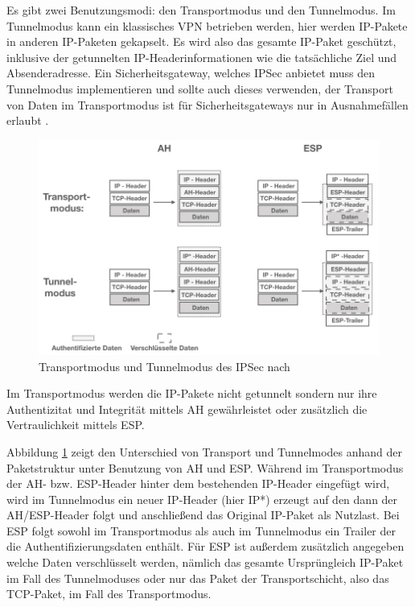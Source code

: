 Es gibt zwei Benutzungsmodi: den Transportmodus und den Tunnelmodus. Im  Tunnelmodus kann ein klassisches VPN betrieben werden, hier werden IP-Pakete in anderen IP-Paketen gekapselt. Es wird also das gesamte IP-Paket geschützt, inklusive der getunnelten IP-Headerinformationen wie die tatsächliche Ziel und Absenderadresse. Ein Sicherheitsgateway, welches IPSec anbietet muss den Tunnelmodus implementieren und sollte auch dieses verwenden, der Transport von Daten im Transportmodus ist für Sicherheitsgateways nur in Ausnahmefällen erlaubt \cite{rfc4301}. 
\begin{figure}[h]
	\includegraphics[width=\linewidth]{ahsep.001.jpeg}
	\caption{Transportmodus und Tunnelmodus des IPSec nach \cite{lipp2007vpn}}
	\label{ahesp}
\end{figure}
Im Transportmodus werden die IP-Pakete nicht getunnelt sondern nur ihre Authentizitat und Integrität mittels AH ge\-währleistet oder zusätzlich die Vertraulichkeit mittels ESP. 

Abbildung \ref{ahesp} zeigt den Unterschied von Transport und Tunnelmodes anhand der Paketstruktur unter Benutzung von AH und ESP. Während im Transportmodus der AH- bzw. ESP-Header  hinter dem bestehenden IP-Header eingefügt wird, wird im Tunnelmodus ein neuer IP-Header (hier IP*) erzeugt auf den dann der AH/ESP-Header folgt und anschließend das Original IP-Paket als Nutzlast. Bei ESP folgt sowohl im Transportmodus als auch im Tunnelmodus ein Trailer der die Authentifizierungsdaten enthält. Für ESP ist außerdem zusätzlich angegeben welche Daten verschlüsselt werden, nämlich das gesamte Ursprüngleich  IP-Paket im Fall des Tunnelmoduses oder nur das Paket der Transportschicht, also  das TCP-Paket, im Fall des Transportmodus. 

